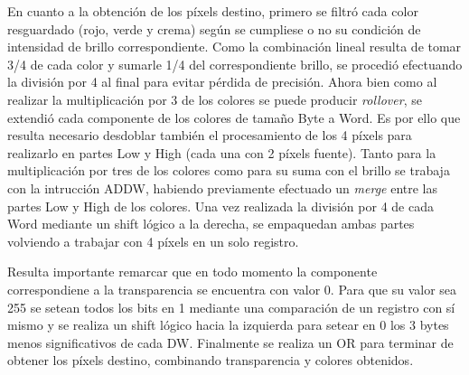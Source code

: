 En cuanto a la obtención de los píxels destino, primero se filtró cada color resguardado (rojo, verde y crema) según se cumpliese o no su condición de intensidad de brillo correspondiente. Como la combinación lineal resulta de tomar 3/4 de cada color y sumarle 1/4 del correspondiente brillo, se procedió efectuando la división por 4 al final para evitar pérdida de precisión. Ahora bien como al realizar la multiplicación por 3 de los colores se puede producir \textit{rollover}, se extendió cada componente de los colores de tamaño Byte a Word. Es por ello que resulta necesario desdoblar también el procesamiento de los 4 píxels para realizarlo en partes Low y High (cada una con 2 píxels fuente). Tanto para la multiplicación por tres de los colores como para su suma con el brillo se trabaja con la intrucción ADDW, habiendo previamente efectuado un \textit{merge} entre las partes Low y High de los colores. Una vez realizada la división por 4 de cada Word mediante un shift lógico a la derecha, se empaquedan ambas partes volviendo a trabajar con 4 píxels en un solo registro. 

Resulta importante remarcar que en todo momento la componente correspondiene a la transparencia se encuentra con valor 0. Para que su valor sea 255 se setean todos los bits en 1 mediante una comparación de un registro con sí mismo y se realiza un shift lógico hacia la izquierda para setear en 0 los 3 bytes menos significativos de cada DW. Finalmente se realiza un OR para terminar de obtener los píxels destino, combinando transparencia y colores obtenidos.


  



